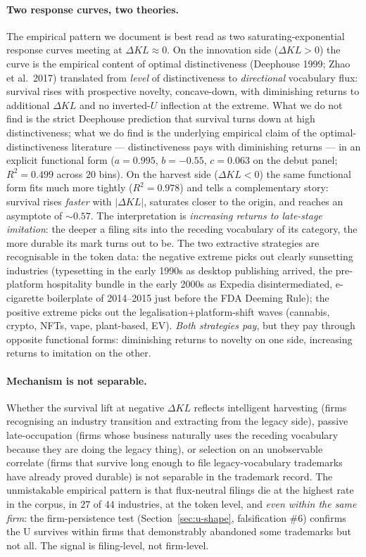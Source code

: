 \documentclass[11pt]{article}
\begin{document}
\paragraph{Two response curves, two theories.}
The empirical pattern we document is best read as two
saturating-exponential response curves meeting at $\Delta KL \approx
0$. On the innovation side ($\Delta KL > 0$) the curve is the
empirical content of optimal distinctiveness (Deephouse 1999;
Zhao et al.\ 2017) translated from \emph{level} of distinctiveness to
\emph{directional} vocabulary flux: survival rises with prospective
novelty, concave-down, with diminishing returns to additional
$\Delta KL$ and no inverted-$U$ inflection at the extreme. What we
do not find is the strict Deephouse prediction that survival turns
down at high distinctiveness; what we do find is the underlying
empirical claim of the optimal-distinctiveness literature ---
distinctiveness pays with diminishing returns --- in an explicit
functional form ($a = 0.995$, $b = -0.55$, $c = 0.063$ on the debut
panel; $R^2 = 0.499$ across $20$ bins). On the harvest side
($\Delta KL < 0$) the same functional form fits much more tightly
($R^2 = 0.978$) and tells a complementary story: survival rises
\emph{faster} with $|\Delta KL|$, saturates closer to the origin,
and reaches an asymptote of $\sim 0.57$. The interpretation is
\emph{increasing returns to late-stage imitation}: the deeper a
filing sits into the receding vocabulary of its category, the more
durable its mark turns out to be. The two extractive strategies
are recognisable in the token data: the negative extreme picks out
clearly sunsetting industries (typesetting in the early 1990s as
desktop publishing arrived, the pre-platform hospitality bundle in
the early 2000s as Expedia disintermediated, e-cigarette
boilerplate of 2014--2015 just before the FDA Deeming Rule); the
positive extreme picks out the legalisation+platform-shift waves
(cannabis, crypto, NFTs, vape, plant-based, EV). \emph{Both
strategies pay}, but they pay through opposite functional forms:
diminishing returns to novelty on one side, increasing returns to
imitation on the other.

\paragraph{Mechanism is not separable.}
Whether the survival lift at negative $\Delta KL$ reflects
intelligent harvesting (firms recognising an industry transition and
extracting from the legacy side), passive late-occupation (firms whose
business naturally uses the receding vocabulary because they are
doing the legacy thing), or selection on an unobservable correlate
(firms that survive long enough to file legacy-vocabulary trademarks
have already proved durable) is not separable in the trademark
record. The unmistakable empirical pattern is that flux-neutral
filings die at the highest rate in the corpus, in $27$ of $44$
industries, at the token level, and \emph{even within the same firm}:
the firm-persistence test
(Section~\ref{sec:u-shape}, falsification \#6) confirms the U
survives within firms that demonstrably abandoned some trademarks
but not all. The signal is filing-level, not firm-level.
\end{document}
